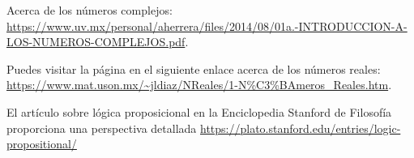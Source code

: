 \documentclass{IEEEcsmag}
\begin{document}
Acerca de los números complejos: \url{https://www.uv.mx/personal/aherrera/files/2014/08/01a.-INTRODUCCION-A-LOS-NUMEROS-COMPLEJOS.pdf}.

Puedes visitar la página en el siguiente enlace acerca de los números reales: \url{https://www.mat.uson.mx/~jldiaz/NReales/1-N%C3%BAmeros_Reales.htm}.

El artículo sobre lógica proposicional en la Enciclopedia Stanford de Filosofía proporciona una perspectiva detallada \url{https://plato.stanford.edu/entries/logic-propositional/}
\end{document}
